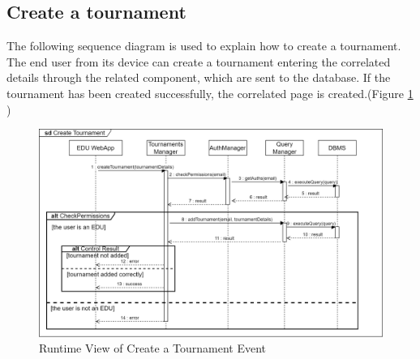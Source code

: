 \subsection{Create a tournament}
The following sequence diagram is used to explain how to create a tournament. The end user from its device can create a tournament entering the correlated details through the related component, which are sent to the database. If the tournament has been created successfully, the correlated page is created.(Figure \ref{fig:RuntimeView_CreateTournament} )
\begin{figure}[H]
    \centering
    \includegraphics[width=\textwidth]{images/runtimeviews/RuntimeView_CreateTournament.png}
    \caption{Runtime View of Create a Tournament Event}
    \label{fig:RuntimeView_CreateTournament}
\end{figure}

\newpage
